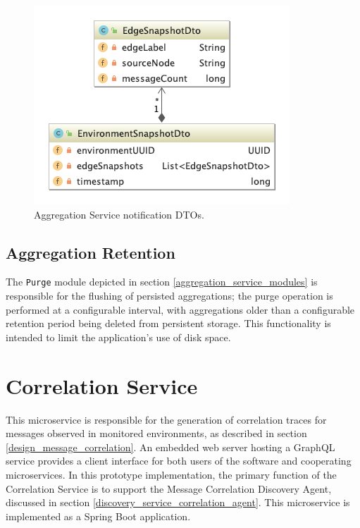 \begin{figure}[H]
	\centering  
	\includegraphics[scale=3.0]{figures/impl/aggregation/dto_package.png}
	\caption{Aggregation Service notification DTOs.}
	\label{aggregation_service_dto_package}
\end{figure}
 
\subsection{Aggregation Retention} \label{aggregation_service_message_retention}
The \texttt{Purge} module depicted in section \ref{aggregation_service_modules} is responsible for the flushing of persisted aggregations; the purge operation is performed at a configurable interval, with aggregations older than a configurable retention period being deleted from persistent storage. This functionality is intended to limit the application's use of disk space. 

\newpage
 
 \section{Correlation Service}
 
This microservice is responsible for the generation of correlation traces for messages observed in monitored environments, as described in section \ref{design_message_correlation}. An embedded web server hosting a GraphQL service provides a client interface for both users of the software and cooperating microservices. In this prototype implementation, the primary function of the Correlation Service is to support the Message Correlation Discovery Agent, discussed in section \ref{discovery_service_correlation_agent}. This microservice is implemented as a Spring Boot application.
 
